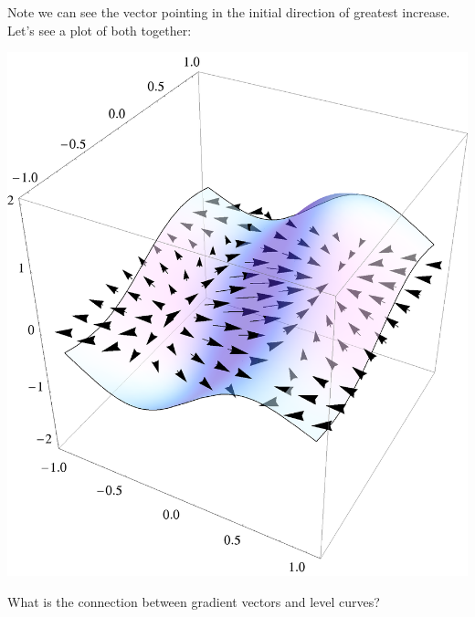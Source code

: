 \documentclass{ximera}
\begin{document}
\begin{example}
\begin{image}
  \end{image}
  Note we can see the vector pointing in the initial direction of
  greatest increase. Let's see a plot of both together:
  \begin{image}
    \includegraphics{gradSurf1.png}
  \end{image}
\end{example}

\begin{question}
  What is the connection between gradient vectors and level curves?
  \begin{prompt}
    \begin{multipleChoice}
    \end{multipleChoice}
  \end{prompt}
\end{question}
\end{document}
